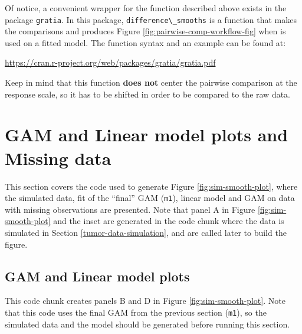 \documentclass[
]{article}
\newcommand{\passthrough}[1]{#1}
\begin{document}
Of notice, a convenient wrapper for the function described above exists in the package \passthrough{\lstinline!gratia!}. In this package, \passthrough{\lstinline!difference\_smooths!} is a function that makes the comparisons and produces Figure \ref{fig:pairwise-comp-workflow-fig} when is used on a fitted model. The function syntax and an example can be found at:

\url{https://cran.r-project.org/web/packages/gratia/gratia.pdf}

Keep in mind that this function \textbf{does not} center the pairwise comparison at the response scale, so it has to be shifted in order to be compared to the raw data.

\hypertarget{gam-and-linear-model-plots-and-missing-data}{%
\section{GAM and Linear model plots and Missing data}\label{gam-and-linear-model-plots-and-missing-data}}

This section covers the code used to generate Figure \ref{fig:sim-smooth-plot}, where the simulated data, fit of the ``final'' GAM (\passthrough{\lstinline!m1!}), linear model and GAM on data with missing observations are presented. Note that panel A in Figure \ref{fig:sim-smooth-plot} and the inset are generated in the code chunk where the data is simulated in Section \ref{tumor-data-simulation}, and are called later to build the figure.

\hypertarget{gam-and-linear-model-plots}{%
\subsection{GAM and Linear model plots}\label{gam-and-linear-model-plots}}

This code chunk creates panels B and D in Figure \ref{fig:sim-smooth-plot}. Note that this code uses the final GAM from the previous section (\passthrough{\lstinline!m1!}), so the simulated data and the model should be generated before running this section.
\end{document}
